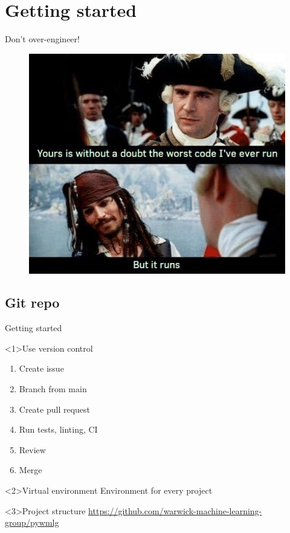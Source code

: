 \documentclass[t]{beamer}
\begin{document}
\section{Getting started}
\begin{frame}{Don't over-engineer!}
    \begin{figure}
        \includegraphics[width=0.75\linewidth]{figures/but-it-runs.jpg}
    \end{figure}
\end{frame}
\subsection{Git repo}
\begin{frame}{Getting started}
    \begin{block}<1>{Use version control}
        \begin{enumerate}
            \item Create issue
            \item Branch from main
            \item Create pull request
            \item Run tests, linting, CI
            \item Review
            \item Merge
        \end{enumerate}
    \end{block}
    \begin{block}<2>{Virtual environment}
        Environment for every project
    \end{block}

    \begin{block}<3>{Project structure}
        \href{https://github.com/warwick-machine-learning-group/pywmlg}{https://github.com/warwick-machine-learning-group/pywmlg}
    \end{block}
\end{frame}
\end{document}
